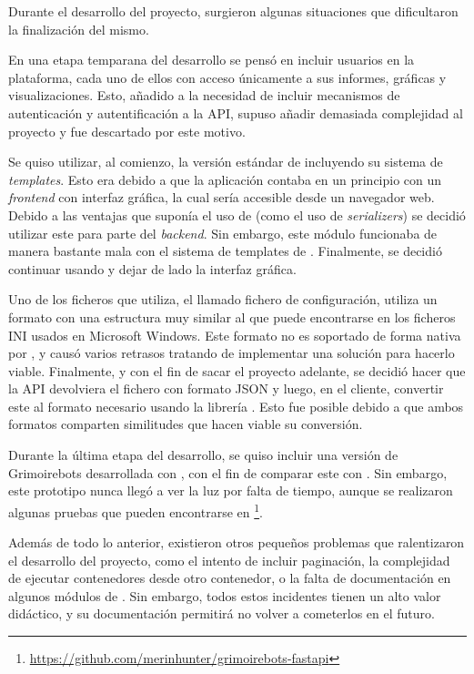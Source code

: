 Durante el desarrollo del proyecto, surgieron algunas situaciones que dificultaron la finalización del mismo.

En una etapa temparana del desarrollo se pensó en incluir usuarios en la plataforma, cada uno de ellos con acceso únicamente a sus informes, gráficas y visualizaciones. Esto, añadido a la necesidad de incluir mecanismos de autenticación y autentificación a la API, supuso añadir demasiada complejidad al proyecto y fue descartado por este motivo.

Se quiso utilizar, al comienzo, la versión estándar de  incluyendo su sistema de \emph{templates}. Esto era debido a que la aplicación contaba en un principio con un \emph{frontend} con interfaz gráfica, la cual sería accesible desde un navegador web. Debido a las ventajas que suponía el uso de  (como el uso de \emph{serializers}) se decidió utilizar este para parte del \emph{backend}. Sin embargo, este módulo funcionaba de manera bastante mala con el sistema de templates de . Finalmente, se decidió continuar usando  y dejar de lado la interfaz gráfica.

Uno de los ficheros que  utiliza, el llamado fichero de configuración, utiliza un formato con una estructura muy similar al que puede encontrarse en los ficheros INI usados en Microsoft Windows. Este formato no es soportado de forma nativa por , y causó varios retrasos tratando de implementar una solución para hacerlo viable. Finalmente, y con el fin de sacar el proyecto adelante, se decidió hacer que la API devolviera el fichero con formato JSON y luego, en el cliente, convertir este al formato necesario usando la librería . Esto fue posible debido a que ambos formatos comparten similitudes que hacen viable su conversión.

Durante la última etapa del desarrollo, se quiso incluir una versión de Grimoirebots desarrollada con , con el fin de comparar este con . Sin embargo, este prototipo nunca llegó a ver la luz por falta de tiempo, aunque se realizaron algunas pruebas que pueden encontrarse en \footnote{\url{https://github.com/merinhunter/grimoirebots-fastapi}}.

Además de todo lo anterior, existieron otros pequeños problemas que ralentizaron el desarrollo del proyecto, como el intento de incluir paginación, la complejidad de ejecutar contenedores desde otro contenedor, o la falta de documentación en algunos módulos de . Sin embargo, todos estos incidentes tienen un alto valor didáctico, y su documentación permitirá no volver a cometerlos en el futuro.
